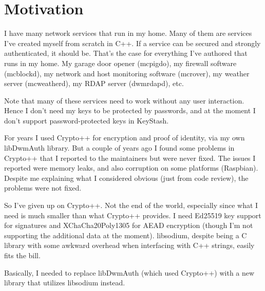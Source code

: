 \chapter{Motivation}
I have many network services that run in my home.  Many of them are
services I've created myself from scratch in C++.  If a service
can be secured and strongly authenticated, it should be.  That's the
case for everything I've authored that runs in my home.  My garage
door opener (mcpigdo), my firewall software (mcblockd), my network
and host monitoring software (mcrover), my weather server
(mcweatherd), my RDAP server (dwmrdapd), etc.

Note that many of these services need to work without any user
interaction.  Hence I don't need my keys to be protected by passwords,
and at the moment I don't support password-protected keys in KeyStash.

For years I used Crypto++ for encryption and proof of identity, via my
own libDwmAuth library.  But a couple of years ago I found some
problems in Crypto++ that I reported to the maintainers but were never
fixed.  The issues I reported were memory leaks, and also corruption
on some platforms (Raspbian).  Despite me explaining what I considered
obvious (just from code review), the problems were not fixed.

So I've given up on Crypto++.  Not the end of the world, especially
since what I need is much smaller than what Crypto++ provides.
I need Ed25519 key support for signatures and XChaCha20Poly1305
for AEAD encryption (though I'm not supporting the additional data
at the moment).  libsodium, despite being a C library with some
awkward overhead when interfacing with C++ strings, easily fits
the bill.

Basically, I needed to replace libDwmAuth (which used Crypto++) with
a new library that utilizes libsodium instead.
